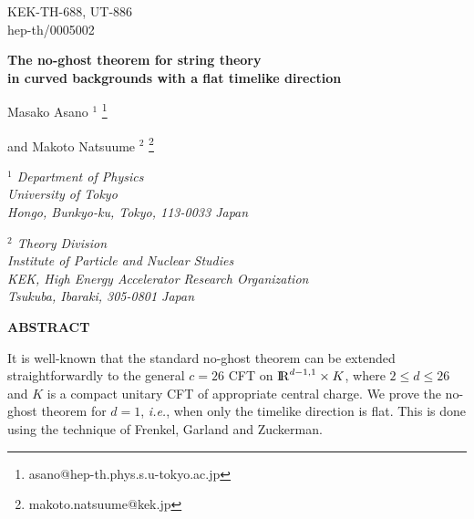 \documentclass[a4paper,12pt]{article}
\makeatletter
\def\fnote#1#2{\begingroup\def\thefootnote{#1}\footnote{#2}
    \addtocounter{footnote}{-1}\endgroup}
\def\Email{makoto.natsuume@kek.jp}
\def\asano{asano@hep-th.phys.s.u-tokyo.ac.jp}
\def\IR{\relax{\rm I\kern-.18em R}}
\makeatother
\begin{document}
\pagestyle{empty}

\begin{flushright}
        KEK-TH-688, UT-886\\
        hep-th/0005002\\
\end{flushright}

\vspace{18pt}

\begin{center}
{\large \bf The no-ghost theorem for string theory} \\ \vspace{4pt}
{\large \bf in curved backgrounds with a flat timelike direction}

\vspace{16pt}
Masako Asano $^{1}$ \fnote{\dag}{\asano} and Makoto Natsuume $^{2}$
\fnote{*}{\Email}

\vspace{16pt}

{\sl $^{1}$ Department of Physics\\
University of Tokyo\\
Hongo, Bunkyo-ku, Tokyo, 113-0033 Japan}

\vspace{8pt}

{\sl $^{2}$ Theory Division\\
Institute of Particle and Nuclear Studies\\
KEK, High Energy Accelerator Research Organization\\
Tsukuba, Ibaraki, 305-0801 Japan}

\vspace{12pt}
{\bf ABSTRACT}

\end{center}

\begin{minipage}{4.8in}
It is well-known that the standard no-ghost theorem can be extended 
straightforwardly to the general $c=26$ CFT on $ \IR^{d-1,1} \times K $, where $2 \leq d \leq 26$ and $ K $ is a compact unitary CFT of appropriate central charge. We prove the no-ghost theorem for $d=1$, {\it i.e.}, when only the timelike direction is flat. This is done using the technique of Frenkel, Garland and Zuckerman.
\end{minipage}
\end{document}
